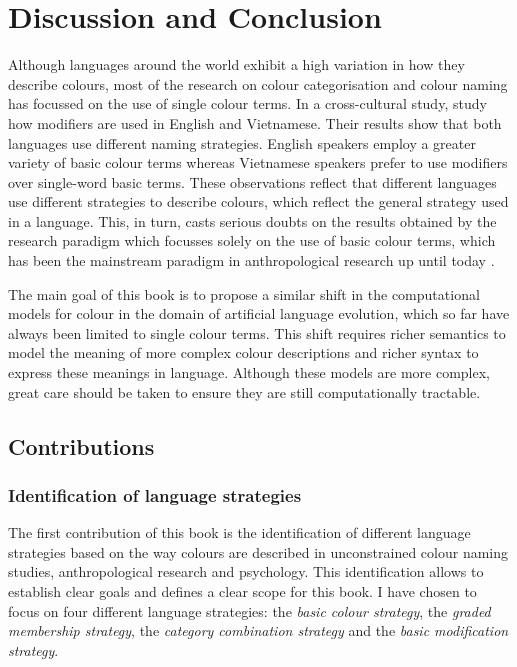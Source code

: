 \chapter{Discussion and Conclusion}
\label{s:conclusion}

Although languages around the world exhibit a high variation in how
they describe colours, most of the research on colour categorisation
and colour naming has focussed on the use of single colour terms. In a
cross-cultural study, \cite{alvarado02modifying} study how modifiers
are used in English and Vietnamese. Their results show that both
languages use different naming strategies. English speakers employ a
greater variety of basic colour terms whereas Vietnamese speakers
prefer to use modifiers over single-word basic terms. These
observations reflect that different languages use different strategies 
to describe colours, which reflect the general strategy used in a language.
This, in turn, casts serious doubts on the results obtained by
the research paradigm which focusses solely on the use of basic colour
terms, which has been the mainstream paradigm in anthropological
research up until today \citep{kay10world}.

The main goal of this book is to propose a similar shift in the
computational models for colour in the domain of artificial language
evolution, which so far have always been limited to single colour terms. This
shift requires richer semantics to model the meaning of more complex
colour descriptions and richer syntax to express these meanings in
language. Although these models are more complex, great care 
should be taken to ensure they are still computationally tractable.

\section{Contributions}
\label{s:contributions}

\subsection{Identification of language strategies}

The first contribution of this book is the identification of
different language strategies based on the way colours are described
in unconstrained colour naming studies, anthropological research and
psychology. This identification allows to establish clear goals and
defines a clear scope for this book. I have chosen to focus on four
different language strategies: the \emph{basic colour strategy}, the
\emph{graded membership strategy}, the \emph{category combination
  strategy} and the \emph{basic modification strategy}.

